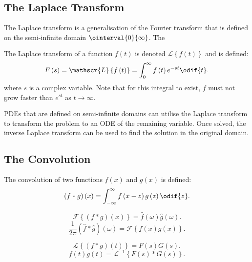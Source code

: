 \documentclass{article}
\begin{document}
\subsection{The Laplace Transform}
The Laplace transform is a generalisation of the Fourier transform that
is defined on the semi-infinite domain \(\ointerval{0}{\infty}\). The
\begin{definition}
    The Laplace transform of a function \(f\left( t \right)\) is denoted
    \(\mathscr{L}\left\{ f\left( t \right) \right\}\) and is defined:
    \begin{equation*}
        F\left( s \right) = \mathscr{L}\left\{ f\left( t \right) \right\} = \int_0^\infty f\left( t \right) e^{-s t} \odif{t}.
    \end{equation*}
    where \(s\) is a complex variable. Note that for this integral to
    exist, \(f\) must not grow faster than \(e^{st}\) as \(t \to \infty\).
\end{definition}
PDEs that are defined on semi-infinite domains can utilise the Laplace
transform to transform the problem to an ODE of the remaining variable.
Once solved, the inverse Laplace transform can be used to find the
solution in the original domain.
\subsection{The Convolution}
The convolution of two functions \(f\left( x \right)\) and \(g\left( x
\right)\) is defined:
\begin{equation*}
    \left( f \ast g \right)\left( x \right) = \int_{-\infty}^\infty f\left( x - z \right) g\left( z \right) \odif{z}.
\end{equation*}
\begin{theorem}
    \begin{equation*}
        \mathscr{F}\left\{ \left( f \ast g \right)\left( x \right) \right\} = \hat{f}\left( \omega \right) \hat{g}\left( \omega \right).
    \end{equation*}
    \begin{equation*}
        \frac{1}{2\pi} \left( \hat{f} \ast \hat{g} \right)\left( \omega \right) = \mathscr{F}\left\{ f\left( x \right) g\left( x \right) \right\}.
    \end{equation*}
\end{theorem}
\begin{theorem}
    \begin{equation*}
        \mathscr{L}\left\{ \left( f \ast g \right)\left( t \right) \right\} = F\left( s \right) G\left( s \right).
    \end{equation*}
    \begin{equation*}
        f\left( t \right) g\left( t \right) = \mathscr{L}^{-1}\left\{ F\left( s \right) \ast G\left( s \right) \right\}.
    \end{equation*}
\end{theorem}
\end{document}

